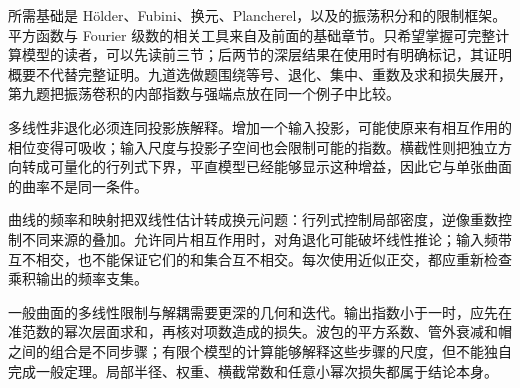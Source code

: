\ProseParagraphBreak

所需基础是 Hölder、Fubini、换元、Plancherel，以及的振荡积分和的限制框架。平方函数与 Fourier 级数的相关工具来自及前面的基础章节。只希望掌握可完整计算模型的读者，可以先读前三节；后两节的深层结果在使用时有明确标记，其证明概要不代替完整证明。九道选做题围绕等号、退化、集中、重数及求和损失展开，第九题把振荡卷积的内部指数与强端点放在同一个例子中比较。







\begin{chaptersummary}
多线性非退化必须连同投影族解释。增加一个输入投影，可能使原来有相互作用的相位变得可吸收；输入尺度与投影子空间也会限制可能的指数。横截性则把独立方向转成可量化的行列式下界，平直模型已经能够显示这种增益，因此它与单张曲面的曲率不是同一条件。

\ProseParagraphBreak

曲线的频率和映射把双线性估计转成换元问题：行列式控制局部密度，逆像重数控制不同来源的叠加。允许同片相互作用时，对角退化可能破坏线性推论；输入频带互不相交，也不能保证它们的和集合互不相交。每次使用近似正交，都应重新检查乘积输出的频率支集。

\ProseParagraphBreak

一般曲面的多线性限制与解耦需要更深的几何和迭代。输出指数小于一时，应先在准范数的幂次层面求和，再核对项数造成的损失。波包的平方系数、管外衰减和帽之间的组合是不同步骤；有限个模型的计算能够解释这些步骤的尺度，但不能独自完成一般定理。局部半径、权重、横截常数和任意小幂次损失都属于结论本身。
\end{chaptersummary}

\BookExercises

